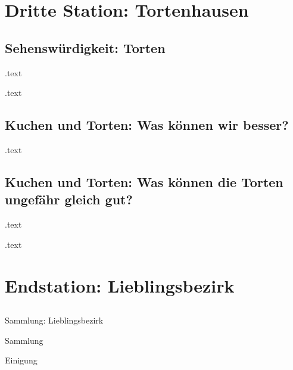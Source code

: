 \documentclass[pdf]{beamer}
\begin{document}
	\section{Dritte Station: Tortenhausen}
		\subsection{Sehenswürdigkeit: Torten}
			\begin{frame}
				.text
			\end{frame}
			\begin{frame}
				.text
			\end{frame}
		\subsection{Kuchen und Torten: Was können wir besser?}
			\begin{frame}
				.text
			\end{frame}
		\subsection{Kuchen und Torten: Was können die Torten ungefähr gleich gut?}
			\begin{frame}
				.text
			\end{frame}
			\begin{frame}
				.text
			\end{frame}
	\section{Endstation: Lieblingsbezirk}
	\subsection*{}
		\begin{frame}
			\centering
			Sammlung: Lieblingsbezirk
		\end{frame}
		\begin{frame}
			\centering
			\Large{Sammlung}
		\end{frame}
		\begin{frame}
			\centering
			\Large{Einigung}
		\end{frame}
\end{document}
